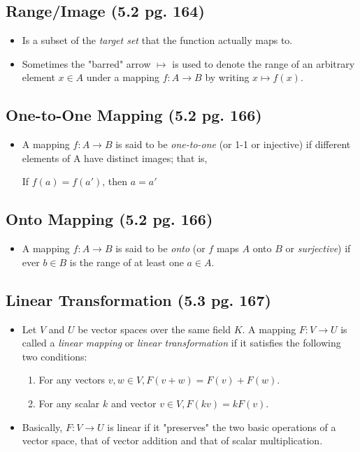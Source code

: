 \documentclass[hidelinks, 11pt, openleft]{scrartcl}
\begin{document}
\subsection*{Range/Image (5.2 pg. 164)}
\begin{itemize}
    \item Is a subset of the \textit{target set} that the function actually maps to. 
    \item Sometimes the "barred" arrow $\mapsto$ is used to denote the range of an arbitrary element $x \in A$ under a mapping $f: A \to B$ by writing $x \mapsto f(x)$.
\end{itemize}


\subsection*{One-to-One Mapping (5.2 pg. 166)}
\begin{itemize}
    \item A mapping $f: A \to B$ is said to be \textit{one-to-one} (or 1-1 or injective) if different elements of A have distinct images; that is,
        \begin{center}
            If $f(a) = f(a')$, then $a=a'$
        \end{center}
\end{itemize}

\subsection*{Onto Mapping (5.2 pg. 166)}
\begin{itemize}
    \item A mapping $f: A \to B$ is said to be \textit{onto} (or $f$ maps $A$ onto $B$ or \textit{surjective}) if ever $b \in B$ is the range of at least one $a \in A$.
\end{itemize}

\subsection*{Linear Transformation (5.3 pg. 167)}
\begin{itemize}
    \item Let $V$ and $U$ be vector spaces over the same field $K$. A mapping $F: V \to U$ is called a \textit{linear mapping} or \textit{linear transformation} if it satisfies the following two conditions:
        \begin{enumerate}
            \item For any vectors $v, w \in V, F(v+w) = F(v) + F(w)$.
            \item For any scalar $k$ and vector $v \in V, F(kv) = kF(v)$.
        \end{enumerate}
    \item Basically, $F: V \to U$ is linear if it "preserves" the two basic operations of a vector space, that of vector addition and that of scalar multiplication.
\end{itemize}
\end{document}
